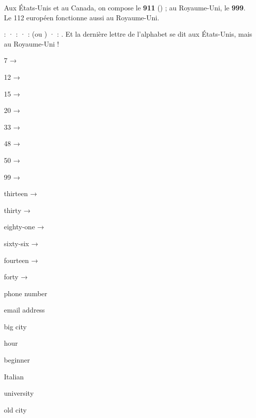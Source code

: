 \begin{paire}
\begin{culture}
Aux États-Unis et au Canada, on compose le \textbf{911} () ; au Royaume-Uni, le
\textbf{999}. Le 112 européen fonctionne aussi au Royaume-Uni.
\end{culture}
\begin{culture}
 :  ·  :  · \en{-} :  (ou ) · \en{\_} :
. Et la dernière lettre de l'alphabet se dit  aux États-Unis, mais
 au Royaume-Uni !
\end{culture}
\end{paire}


\begin{questions}[2]
\item 7 → 
\item 12 → 
\item 15 → 
\item 20 → 
\item 33 → 
\item 48 → 
\item 50 → 
\item 99 → 
\end{questions}

\begin{questions}[3]
\item thirteen → 
\item thirty → 
\item eighty-one → 
\item sixty-six → 
\item fourteen → 
\item forty → 
\end{questions}

\begin{questions}[2]
\item {} phone number
\item {} email address
\item {} big city
\item {} hour
\item {} beginner
\item {} Italian
\item {} university
\item {} old city
\end{questions}

